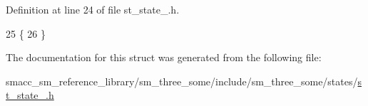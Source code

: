Definition at line 24 of file st\+\_\+state\+\_.\+h.


\begin{DoxyCode}
25     \{
26     \}
\end{DoxyCode}


The documentation for this struct was generated from the following file\+:\begin{DoxyCompactItemize}
\item 
smacc\+\_\+sm\+\_\+reference\+\_\+library/sm\+\_\+three\+\_\+some/include/sm\+\_\+three\+\_\+some/states/\hyperlink{sm__three__some_2include_2sm__three__some_2states_2st__state__1_8h}{st\+\_\+state\+\_.\+h}\end{DoxyCompactItemize}
